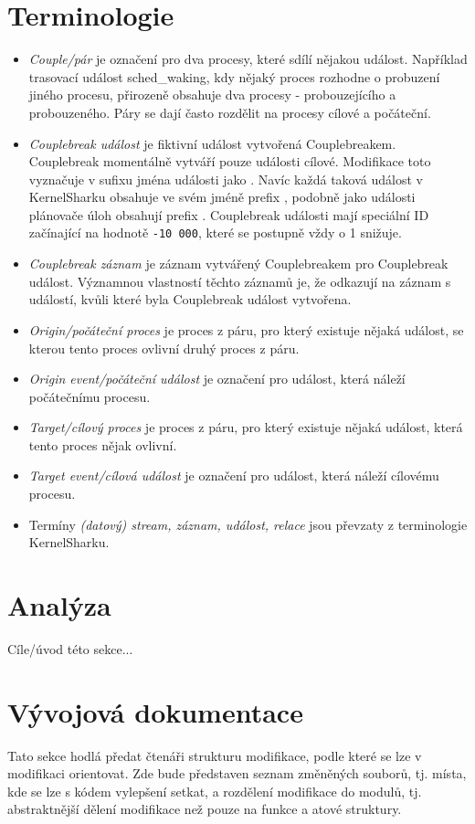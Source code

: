 \section{Terminologie}
\begin{itemize}
    \item \emph{Couple/pár} je označení pro dva procesy, které sdílí nějakou událost. Například trasovací událost sched\_waking, kdy nějaký proces rozhodne o probuzení jiného procesu, přirozeně obsahuje dva procesy - probouzejícího a probouzeného. Páry se dají často rozdělit na procesy cílové a počáteční.
    \item \emph{Couplebreak událost} je fiktivní událost vytvořená Couplebreakem. Couplebreak momentálně vytváří pouze události cílové. Modifikace toto vyznačuje v sufixu jména události jako \uv{[target]}. Navíc každá taková událost v KernelSharku obsahuje ve svém jméně prefix , podobně jako události plánovače úloh obsahují prefix . Couplebreak události mají speciální ID začínající na hodnotě \texttt{-10 000}, které se postupně vždy o 1 snižuje.
    \item \emph{Couplebreak záznam} je záznam vytvářený Couplebreakem pro Couplebreak událost. Významnou vlastností těchto záznamů je, že odkazují na záznam s událostí, kvůli které byla Couplebreak událost vytvořena.
    \item \emph{Origin/počáteční proces} je proces z páru, pro který existuje nějaká událost, se kterou tento proces ovlivní druhý proces z páru.
    \item \emph{Origin event/počáteční událost} je označení pro událost, která náleží počátečnímu procesu.
    \item \emph{Target/cílový proces} je proces z páru, pro který existuje nějaká událost, která tento proces nějak ovlivní. 
    \item \emph{Target event/cílová událost} je označení pro událost, která náleží cílovému procesu.
    \item Termíny \emph{(datový) stream, záznam, událost, relace} jsou převzaty z terminologie KernelSharku.
\end{itemize}

\section{Analýza}
Cíle/úvod této sekce...

\section{Vývojová dokumentace}
Tato sekce hodlá předat čtenáři strukturu modifikace, podle které se lze v modifikaci orientovat. Zde bude představen seznam změněných souborů, tj. místa, kde se lze s kódem vylepšení setkat, a rozdělení modifikace do modulů, tj. abstraktnější dělení modifikace než pouze na funkce a atové struktury.

